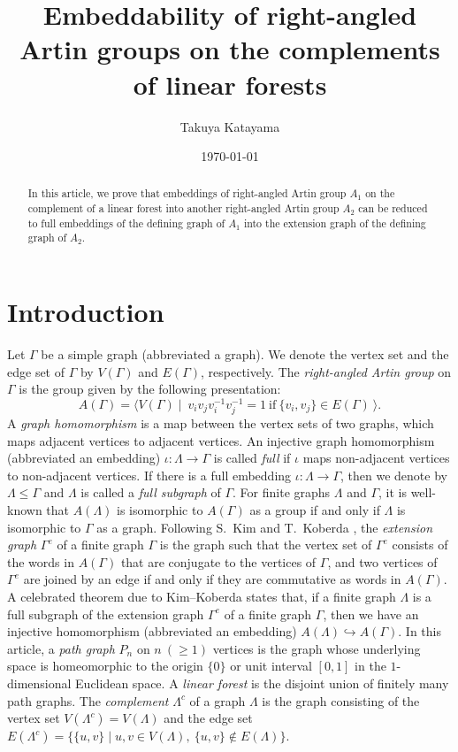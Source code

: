 \documentclass{amsart}
\title[Embeddability of RAAGs on complements of linear forests]{Embeddability of right-angled Artin groups on the complements of linear forests}
\author[T.~Katayama]{Takuya Katayama}
\date{\today}
\theoremstyle{definition}
\theoremstyle{plain}
\numberwithin{equation}{section}
\begin{document}
\begin{abstract}
In this article, we prove that embeddings of right-angled Artin group $A_1$ on the complement of a linear forest into another right-angled Artin group $A_2$ can be reduced to full embeddings of the defining graph of $A_1$ into the extension graph of the defining graph of $A_2$. 
\end{abstract}

\maketitle


\section{Introduction}\label{Introduction}
Let $\Gamma$ be a simple graph (abbreviated a graph). 
We denote the vertex set and the edge set of $\Gamma$ by $V(\Gamma)$ and $E(\Gamma)$, respectively. 
The {\it right-angled Artin group} on $\Gamma$ is the group given by the following presentation:
$$
A(\Gamma) = \langle V(\Gamma) \mid \  v_i v_j v_i^{-1} v_j^{-1} = 1  \ \mbox{if} \ \{ v_i,v_j \} \in E(\Gamma) \ \rangle
.$$ 
A {\it graph homomorphism} is a map between the vertex sets of two graphs, which maps adjacent vertices to adjacent vertices. 
An injective graph homomorphism (abbreviated an embedding) $\iota \colon \Lambda \rightarrow \Gamma$ is called {\it full} if $\iota$ maps non-adjacent vertices to non-adjacent vertices. 
If there is a full embedding $\iota \colon \Lambda \rightarrow \Gamma$, then we denote by $\Lambda \leq \Gamma$ and $\Lambda$ is called a {\it full subgraph} of $\Gamma$. 
For finite graphs $\Lambda$ and $\Gamma$, it is well-known that $A(\Lambda)$ is isomorphic to $A(\Gamma)$ as a group if and only if $\Lambda$ is isomorphic to $\Gamma$ as a graph. 
Following S.~Kim and T.~Koberda \cite{Kim--Koberda13}, the {\it extension graph} $\Gamma^e$ of a finite graph $\Gamma$ is the graph such that the vertex set of $\Gamma^e$ consists of the words in $A(\Gamma)$ that are conjugate to the vertices of $\Gamma$, and two vertices of $\Gamma^e$ are joined by an edge if and only if they are commutative as words in $A(\Gamma)$. 
A celebrated theorem due to Kim--Koberda states that, if a finite graph $\Lambda$ is a full subgraph of the extension graph $\Gamma^e$ of a finite graph $\Gamma$, then we have an injective homomorphism (abbreviated an embedding) $A(\Lambda) \hookrightarrow A(\Gamma)$. 
In this article, a {\it path graph} $P_n$ on $n \ (\geq 1)$ vertices is the graph whose underlying space is homeomorphic to the origin $\{ 0 \}$ or unit interval $[0, 1]$ in the $1$-dimensional Euclidean space. 
A {\it linear forest} is the disjoint union of finitely many path graphs. 
The {\it complement} $\Lambda^c$ of a graph $\Lambda$ is the graph consisting of the vertex set $V(\Lambda^c) = V(\Lambda)$ and the edge set $E(\Lambda^c)= \{ \{ u, v \} \mid u,v \in V(\Lambda), \ \{ u , v \} \notin E(\Lambda) \}$. 
\end{document}
